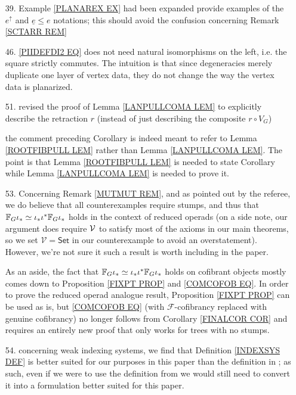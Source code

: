 \documentclass{article}
\begin{document}
\begin{itemize}
	\item[39.] Example \ref{PLANAREX EX} had been expanded provide examples of the $e^{\uparrow}$
	and $\underline{e} \leq e$
	notations; this should avoid the confusion concerning 
	Remark \ref{SCTARR REM}
	
	\item[46.] \eqref{PIIDEFDI2 EQ} does not need natural isomorphisms on the left, i.e. the square strictly commutes. The intuition is that since degeneracies merely duplicate one layer of vertex data, they do not change the way the vertex data is planarized. 
	
	\item[51.] 
	revised the proof of Lemma \ref{LANPULLCOMA LEM}
	to explicitly describe the retraction $r$ (instead of just describing the composite $r \circ V_G$)
	
	the comment preceding Corollary \label{MONDEFCOR COR}
	is indeed meant to refer to Lemma \ref{ROOTFIBPULL LEM}
	rather than Lemma \ref{LANPULLCOMA LEM}.
	The point is that Lemma \ref{ROOTFIBPULL LEM}
	is needed to state Corollary \label{MONDEFCOR COR}
	while 
	Lemma \ref{LANPULLCOMA LEM} is needed to prove it.

	\item[53.] Concerning Remark \ref{MUTMUT REM},
	and as pointed out by the referee,
	we do believe that all counterexamples require stumps,
	and thus that
	$\mathbb{F}_G \iota_{\**} \simeq 
	\iota_{\**} \iota^{\**} \mathbb{F}_G \iota_{\**}$
	holds in the context of reduced operads
	(on a side note, our argument does require $\mathcal V$ to satisfy most of the axioms in our main theorems, 
	so we set $\mathcal{V}=\mathsf{Set}$ in our counterexample
	to avoid an overstatement).
%	
	However, we're not sure it such a result is worth including in the paper.
	
	As an aside, the fact that 	
	$\mathbb{F}_G \iota_{\**} \simeq 
	\iota_{\**} \iota^{\**} \mathbb{F}_G \iota_{\**}$
	holds on cofibrant objects mostly comes down to
	Proposition \ref{FIXPT PROP} 
	and \eqref{COMCOFOB EQ}.
%	
	In order to prove the reduced operad analogue result, 
	Proposition \ref{FIXPT PROP} can be used as is, 
	but \eqref{COMCOFOB EQ} 
	(with $\mathcal{F}$-cofibrancy replaced with genuine cofibrancy)
	no longer follows from Corollary \ref{FINALCOR COR}
	and requires an entirely new proof that only works
	for trees with no stumps.
	
	\item[54.] concerning weak indexing systems,
	we find that Definition \ref{INDEXSYS DEF}
	is better suited for our purposes in this paper than 
	the definition in \cite{Pe17}; as such, even if we were to use the definition from \cite{Pe17} we would still need to convert it into a formulation better suited for this paper.
	

\end{itemize}
\end{document}
